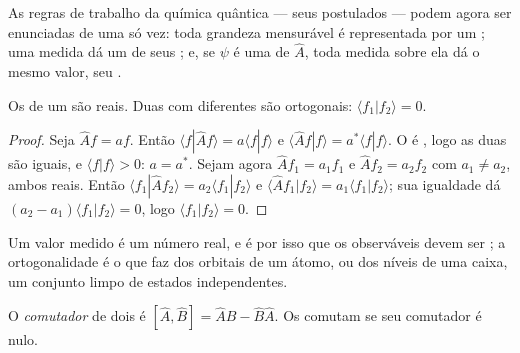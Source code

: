 As regras de trabalho da química quântica --- seus postulados --- podem
agora ser enunciadas de uma só vez: toda grandeza mensurável é representada
por um ; uma medida dá um de seus ; e, se
$\psi$ é uma  de $\hat A$, toda medida sobre ela dá o mesmo valor,
seu .

\begin{theorem}\label{thm:b3:quantum-model-systems:hermitian-real}
Os  de um  são reais. Duas  com
 diferentes são ortogonais: $\langle f_1|f_2\rangle = 0$.
\end{theorem}

\begin{proof}
Seja $\hat Af = af$. Então $\langle f|\hat Af\rangle = a\langle f|f\rangle$ e
$\langle\hat Af|f\rangle = a^*\langle f|f\rangle$. O  é ,
logo as duas são iguais, e $\langle f|f\rangle > 0$: $a = a^*$. Sejam agora $\hat Af_1
= a_1f_1$ e $\hat Af_2 = a_2f_2$ com $a_1 \ne a_2$, ambos reais. Então
$\langle f_1|\hat Af_2\rangle = a_2\langle f_1|f_2\rangle$ e $\langle\hat Af_1|
f_2\rangle = a_1\langle f_1|f_2\rangle$; sua igualdade dá $(a_2 - a_1)
\langle f_1|f_2\rangle = 0$, logo $\langle f_1|f_2\rangle = 0$.
\end{proof}

Um valor medido é um número real, e é por isso que os observáveis devem ser
; a ortogonalidade é o que faz dos orbitais de um átomo, ou dos
níveis de uma caixa, um conjunto limpo de estados independentes.

\begin{definition}[Comutador]\label{def:b3:quantum-model-systems:commutator}
O \emph{comutador} de dois  é $[\hat A,\hat B] =
\hat A\hat B - \hat B\hat A$. Os  comutam se seu comutador é
nulo.
\end{definition}


